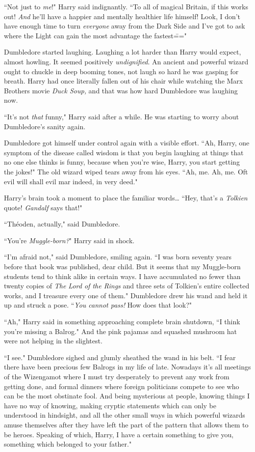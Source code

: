 ``Not just to \emph{me}!" Harry said indignantly. ``To all of magical Britain, if this works out! \emph{And} he'll have a happier and mentally healthier life himself! Look, I don't have enough time to turn \emph{everyone} away from the Dark Side and I've got to ask where the Light can gain the most advantage the fastest\==="

Dumbledore started laughing. Laughing a lot harder than Harry would expect, almost howling. It seemed positively \emph{undignified}. An ancient and powerful wizard ought to chuckle in deep booming tones, not laugh so hard he was gasping for breath. Harry had once literally fallen out of his chair while watching the Marx Brothers movie \emph{Duck Soup,} and that was how hard Dumbledore was laughing now.

``It's not \emph{that} funny," Harry said after a while. He was starting to worry about Dumbledore's sanity again.

Dumbledore got himself under control again with a visible effort. ``Ah, Harry, one symptom of the disease called wisdom is that you begin laughing at things that no one else thinks is funny, because when you're wise, Harry, you start getting the jokes!" The old wizard wiped tears away from his eyes. ``Ah, me. Ah, me. Oft evil will shall evil mar indeed, in very deed."

Harry's brain took a moment to place the familiar words{\ldots} ``Hey, that's a \emph{Tolkien} quote! \emph{Gandalf} says that!"

``Théoden, actually," said Dumbledore.

``You're \emph{Muggle-born?}" Harry said in shock.

``I'm afraid not," said Dumbledore, smiling again. ``I was born seventy years before that book was published, dear child. But it seems that my Muggle-born students tend to think alike in certain ways. I have accumulated no fewer than twenty copies of \emph{The Lord of the Rings} and three sets of Tolkien's entire collected works, and I treasure every one of them." Dumbledore drew his wand and held it up and struck a pose. ``\emph{You cannot pass!} How does that look?"

``Ah," Harry said in something approaching complete brain shutdown, ``I think you're missing a Balrog." And the pink pajamas and squashed mushroom hat were not helping in the slightest.

``I see." Dumbledore sighed and glumly sheathed the wand in his belt. ``I fear there have been precious few Balrogs in my life of late. Nowadays it's all meetings of the Wizengamot where I must try desperately to prevent any work from getting done, and formal dinners where foreign politicians compete to see who can be the most obstinate fool. And being mysterious at people, knowing things I have no way of knowing, making cryptic statements which can only be understood in hindsight, and all the other small ways in which powerful wizards amuse themselves after they have left the part of the pattern that allows them to be heroes. Speaking of which, Harry, I have a certain something to give you, something which belonged to your father."

